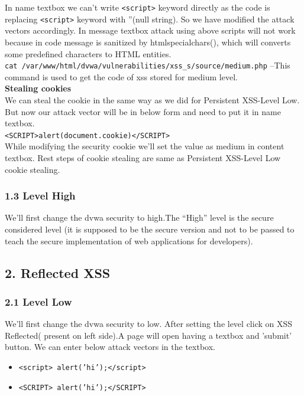 \documentclass{article}
\begin{document}
In name textbox we can't write {\tt <script>} keyword directly as the code is replacing {\tt <script>} keyword with ''(null string). So we have modified the attack vectors accordingly.
In message textbox attack using above scripts will not work because in code message is sanitized by htmlspecialchars(), which will converts some predefined characters to HTML entities.\\
{\tt cat /var/www/html/dvwa/vulnerabilities/xss\_s/source/medium.php} --This command is used to get the code of xss stored for medium level.\\

\noindent \textbf{Stealing cookies}\\
We can steal the cookie in the same way as we did for Persistent XSS-Level Low. But now our attack vector will be in below form and need to put it in name textbox.\\
{\tt <SCRIPT>alert(document.cookie)</SCRIPT>}\\
While modifying  the security cookie we'll set the value as medium in content textbox. Rest steps of cookie stealing are same as Persistent XSS-Level Low cookie stealing.
\subsubsection*{1.3 Level High}
We'll first change the dvwa security to high.The “High” level is the secure considered level (it is supposed to be the secure version and not to be passed to teach the secure implementation of web applications for developers).

\subsection*{2. Reflected XSS}
\subsubsection*{2.1 Level Low}
We'll first change the dvwa security to low. After setting the level click on XSS Reflected( present on left side).A page will open having a textbox and 'submit' button. We can enter below attack vectors in the textbox.\\
\begin{itemize}
     \item {\tt <script> alert('hi');</script>}
     \item {\tt <SCRIPT> alert('hi');</SCRIPT>}
\end{itemize}
\end{document}
